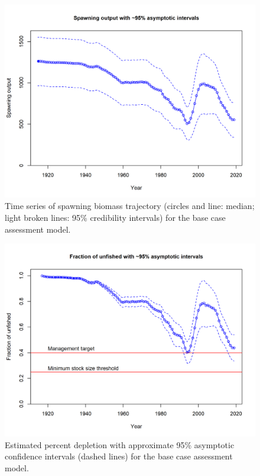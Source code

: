 \documentclass[12pt,]{article}
\begin{document}
\FloatBarrier

\begin{figure}
\centering
\includegraphics{r4ss/plots_mod1/ts7_Spawning_output_with_95_asymptotic_intervals_intervals.png}
\caption{Time series of spawning biomass trajectory (circles and line:
median; light broken lines: 95\% credibility intervals) for the base
case assessment model. \label{fig:Spawnbio_all}}
\end{figure}

\begin{figure}
\centering
\includegraphics{r4ss/plots_mod1/ts9_Fraction_of_unfished_with_95_asymptotic_intervals_intervals.png}
\caption{Estimated percent depletion with approximate 95\% asymptotic
confidence intervals (dashed lines) for the base case assessment model.
\label{fig:RelDeplete_all}}
\end{figure}
\end{document}
